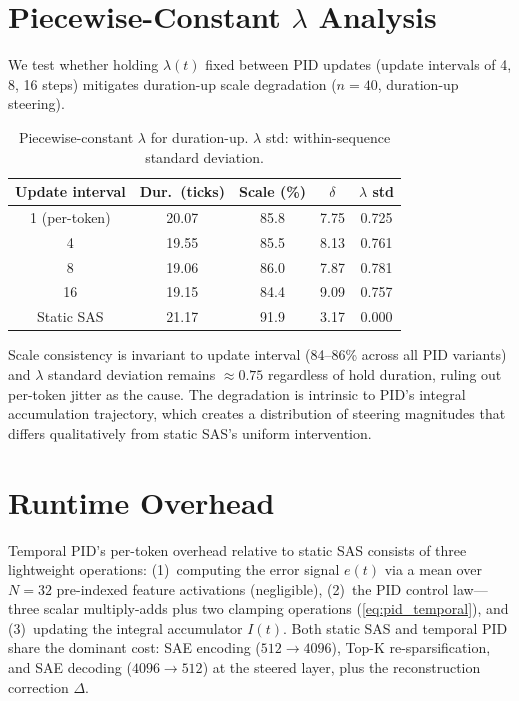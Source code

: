 \documentclass{article}
\theoremstyle{plain}
\begin{document}
\section{Piecewise-Constant $\lambda$ Analysis}
\label{app:piecewise}

We test whether holding $\lambda(t)$ fixed between PID updates (update intervals of 4, 8, 16 steps) mitigates duration-up scale degradation ($n{=}40$, duration-up steering).

\begin{table}[h]
  \caption{Piecewise-constant $\lambda$ for duration-up. $\lambda$ std: within-sequence standard deviation.}
  \label{tab:piecewise}
  \begin{center}
  \begin{small}
  \begin{tabular}{ccccc}
    \toprule
    Update interval & Dur.\ (ticks) & Scale (\%) & $\delta$ & $\lambda$ std \\
    \midrule
    1 (per-token) & 20.07 & 85.8 & 7.75 & 0.725 \\
    4 & 19.55 & 85.5 & 8.13 & 0.761 \\
    8 & 19.06 & 86.0 & 7.87 & 0.781 \\
    16 & 19.15 & 84.4 & 9.09 & 0.757 \\
    \midrule
    Static SAS & 21.17 & 91.9 & 3.17 & 0.000 \\
    \bottomrule
  \end{tabular}
  \end{small}
  \end{center}
\end{table}

Scale consistency is invariant to update interval (84--86\% across all PID variants) and $\lambda$ standard deviation remains ${\approx}0.75$ regardless of hold duration, ruling out per-token jitter as the cause. The degradation is intrinsic to PID's integral accumulation trajectory, which creates a distribution of steering magnitudes that differs qualitatively from static SAS's uniform intervention.

\section{Runtime Overhead}
\label{app:runtime}

Temporal PID's per-token overhead relative to static SAS consists of three lightweight operations: (1)~computing the error signal $e(t)$ via a mean over $N{=}32$ pre-indexed feature activations (negligible), (2)~the PID control law---three scalar multiply-adds plus two clamping operations (\cref{eq:pid_temporal}), and (3)~updating the integral accumulator $I(t)$. Both static SAS and temporal PID share the dominant cost: SAE encoding ($512 {\to} 4096$), Top-K re-sparsification, and SAE decoding ($4096 {\to} 512$) at the steered layer, plus the reconstruction correction $\Delta$.
\end{document}
